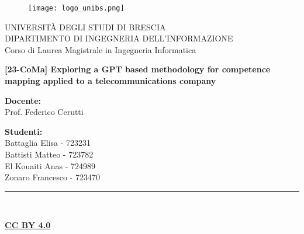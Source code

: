 \parindent=0pt
\sloppy
\begin{titlepage}

    \begin{figure}[ht]
        \centering\texttt{[image: logo\_unibs.png]}
    \end{figure}

    \begin{center}
        \LARGE{\uppercase{Università degli Studi di Brescia}}\\
        \vspace{5mm}
        \large{\uppercase{Dipartimento di Ingegneria dell'informazione}}\\
        \vspace{5mm}
        \large{Corso di Laurea Magistrale in Ingegneria Informatica}\\
    \end{center}

    \vspace{10mm}

    \begin{center}
        \LARGE{\textbf{[23-CoMa] Exploring a GPT based methodology for competence
                mapping applied to a telecommunications
                company}}\\
    \end{center}

    \vspace{10mm}

    \begin{flushleft}
        \large
        \textbf{Docente:}\\
        Prof. Federico Cerutti
    \end{flushleft}
    \begin{flushright}
        \large
        \textbf{Studenti:}\\
        Battaglia Elisa - 723231\\
        Battisti Matteo - 723782\\
        El Kouaiti Anas - 724989\\
        Zonaro Francesco - 723470
    \end{flushright}

    \vspace*{\fill}

    \rule{0.8\textwidth}{0.6pt}\\
    \begin{center}
        \ccbysa
    \end{center}
    \begin{center}
        \href{https://creativecommons.org/licenses/by/4.0/}{\textbf{CC BY 4.0}}
    \end{center}
\end{titlepage}